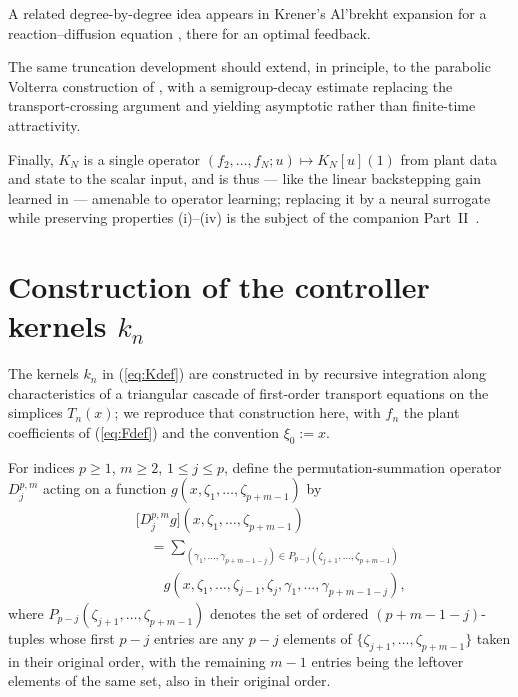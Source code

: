 \documentclass[10pt,a4paper]{amsart}
\begin{document}
A related degree-by-degree idea appears in Krener's Al'brekht expansion for a reaction--diffusion equation \cite{9580683}, there for an optimal feedback.

The same truncation development should extend, in principle, to the parabolic Volterra construction of \cite{vazquez2008volterra1,vazquez2008volterra2}, with a semigroup-decay estimate replacing the transport-crossing argument and yielding asymptotic rather than finite-time attractivity.

Finally, $K_N$ is a single operator $(f_2, \ldots, f_N; u) \mapsto K_N[u](1)$ from plant data and state to the scalar input, and is thus --- like the linear backstepping gain learned in \cite{Bhan2024Neural} --- amenable to operator learning; replacing it by a neural surrogate while preserving properties (i)--(iv) is the subject of the companion Part~II~\cite{krstic2026feedbacklinearizationhyperbolicpdes-NO}.

\appendix

\section{Construction of the controller kernels $k_n$}\label{app:kndef}

The kernels $k_n$ in (\ref{eq:Kdef}) are constructed in \cite{krstic2026feedbacklinearizationhyperbolicpdes} by recursive integration along characteristics of a triangular cascade of first-order transport equations on the simplices $T_n(x)$; we reproduce that construction here, with $f_n$ the plant coefficients of (\ref{eq:Fdef}) and the convention $\xi_0 := x$.

For indices $p \ge 1$, $m \ge 2$, $1 \le j \le p$, define the permutation-summation operator $D_j^{p,m}$ acting on a function $g(x, \zeta_1, \ldots, \zeta_{p+m-1})$ by
\begin{eqnarray}
&& \bigl[D_j^{p,m} g\bigr](x, \zeta_1, \ldots, \zeta_{p+m-1}) \nonumber \\
&& \quad = \sum_{(\gamma_1,\ldots,\gamma_{p+m-1-j}) \in P_{p-j}(\zeta_{j+1},\ldots,\zeta_{p+m-1})} \nonumber \\
&& \quad\quad g(x, \zeta_1, \ldots, \zeta_{j-1}, \zeta_j, \gamma_1, \ldots, \gamma_{p+m-1-j}),
\label{eq:Ddef}
\end{eqnarray}
where $P_{p-j}(\zeta_{j+1}, \ldots, \zeta_{p+m-1})$ denotes the set of ordered $(p+m-1-j)$-tuples whose first $p-j$ entries are any $p-j$ elements of $\{\zeta_{j+1}, \ldots, \zeta_{p+m-1}\}$ taken in their original order, with the remaining $m-1$ entries being the leftover elements of the same set, also in their original order.
\end{document}
